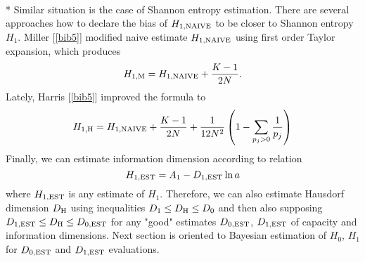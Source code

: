 \documentclass[a4paper,10pt]{article}
\begin{document}
\\*
Similar situation is the case of Shannon entropy estimation. There are several approaches how to declare the bias of $H_{1,\mbox{\scriptsize{NAIVE}}}$ to be closer to Shannon entropy $H_{1}$. Miller [\ref{bib5}] modified naive estimate $H_{1,\mbox{\scriptsize{NAIVE}}}$ using first order Taylor expansion, which produces
\begin{equation}
\label{eq:miller}
H_{1,\mbox{\scriptsize{M}}}=H_{1,\mbox{\scriptsize{NAIVE}}} + \frac{K-1}{2N}.
\end{equation}
Lately, Harris [\ref{bib5}] improved the formula to
\begin{equation}
\label{eq:harris1h}
H_{1,\mbox{\scriptsize{H}}}=H_{1,\mbox{\scriptsize{NAIVE}}} + \frac{K-1}{2N} + \frac{1}{12N^2} \left( 1 - \sum_{p_{j}>0}\frac{1}{p_{j}} \right)
\end{equation}
Finally, we can estimate information dimension according to relation
\begin{equation} 
\label{eq:hjednaest}
H_{1,\mbox{\scriptsize{EST}}}=A_{1} - D_{1,\mbox{\scriptsize{EST}}} \ln{a}
\end{equation} 
where $H_{1,\mbox{\scriptsize{EST}}}$ is any estimate of $H_{1}$. Therefore, we can also estimate Hausdorf dimension $D_{\mbox{\scriptsize{H}}}$ using inequalities $D_{1} \le D_{\mbox{\scriptsize{H}}} \le D_{0}$ and then also supposing $D_{1,\mbox{\scriptsize{EST}}} \le D_{\mbox{\scriptsize{H}}} \le D_{0,\mbox{\scriptsize{EST}}}$ for any "good" estimates $D_{0,\mbox{\scriptsize{EST}}}$, $D_{1,\mbox{\scriptsize{EST}}}$ of capacity and information dimensions. Next section is oriented to Bayesian estimation of $H_{0}$, $H_{1}$ for $D_{0,\mbox{\scriptsize{EST}}}$ and $D_{1,\mbox{\scriptsize{EST}}}$ evaluations.
\end{document}
